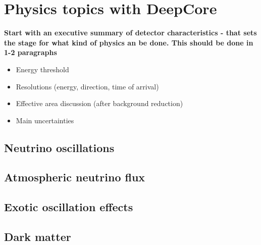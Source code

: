 \documentclass[../Main.tex]{subfiles}
\begin{document}
       {}       {}
    {}    {}
 {} {}


\graphicspath{{figures/}{Physics/figures/}}


\section{Physics topics with DeepCore}

\textbf{Start with an executive summary of detector characteristics - that sets the stage for what kind of physics an be done. This should be done in 1-2 paragraphs}
\begin{itemize}
\item Energy threshold
\item Resolutions (energy, direction, time of arrival)
\item Effective area discussion (after background reduction)
\item Main uncertainties
\end{itemize}

\subsection{Neutrino oscillations}

\subsection{Atmospheric neutrino flux}

\subsection{Exotic oscillation effects}

\subsection{Dark matter}
\end{document}
